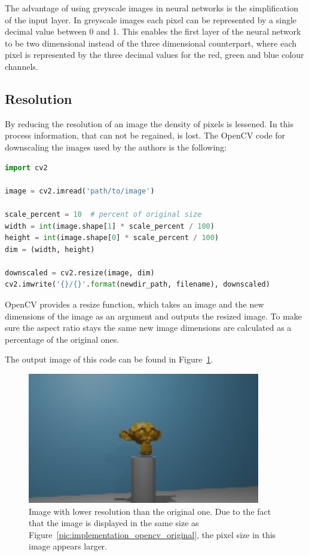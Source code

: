 The advantage of using greyscale images in neural networks is the simplification of the input layer. In greyscale images each pixel can be represented by a single decimal value between 0 and 1. This enables the first layer of the neural network to be two dimensional instead of the three dimensional counterpart, where each pixel is represented by the three decimal values for the red, green and blue colour channels.

\subsection{Resolution}
By reducing the resolution of an image the density of pixels is lessened. In this process information, that can not be regained, is lost. The OpenCV code for downscaling the images used by the authors is the following:

\begin{lstlisting}[language=python]
import cv2

image = cv2.imread('path/to/image')

scale_percent = 10  # percent of original size
width = int(image.shape[1] * scale_percent / 100)
height = int(image.shape[0] * scale_percent / 100)
dim = (width, height)

downscaled = cv2.resize(image, dim)
cv2.imwrite('{}/{}'.format(newdir_path, filename), downscaled)
\end{lstlisting}

OpenCV provides a resize function, which takes an image and the new dimensions of the image as an argument and outputs the resized image. To make sure the aspect ratio stays the same new image dimensions are calculated as a percentage of the original ones.

The output image of this code can be found in Figure~\ref{pic:implementation_opencv_resolution}.

\begin{figure}[h!]
	\centering
	\includegraphics[width=4in]{img/implementation_opencv_resolution.jpg}
	\caption{Image with lower resolution than the original one. Due to the fact that the image is displayed in the same size as Figure~\ref{pic:implementation_opencv_original}, the pixel size in this image appears larger.}
	\label{pic:implementation_opencv_resolution}
\end{figure}

